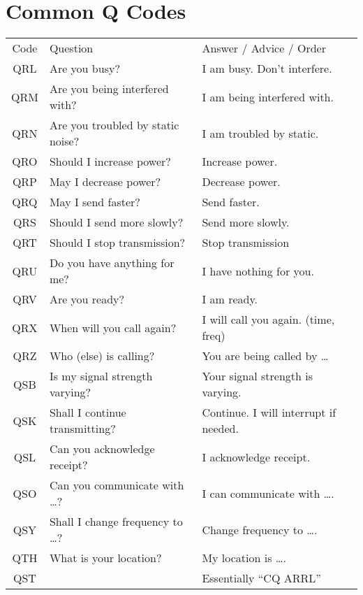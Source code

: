 \documentclass[11pt, onecolumn, table]{article}
\begin{document}
\section{Common Q Codes}
\begin{center}
  \begin{tabular}{c l l}
    Code	& Question								& Answer / Advice / Order				\\
    QRL		& Are you busy?							& I am busy. Don't interfere.			\\
    QRM		& Are you being interfered with?		& I am being interfered with.			\\
    QRN		& Are you troubled by static noise?		& I am troubled by static.				\\
    QRO		& Should I increase power?				& Increase power.						\\
    QRP		& May I decrease power?					& Decrease power.						\\
    QRQ		& May I send faster?					& Send faster.							\\
    QRS		& Should I send more slowly?			& Send more slowly.						\\
    QRT		& Should I stop transmission?			& Stop transmission						\\
    QRU		& Do you have anything for me?			& I have nothing for you.				\\
    QRV		& Are you ready?						& I am ready.							\\
    QRX		& When will you call again?				& I will call you again. (time, freq)	\\
    QRZ		& Who (else) is calling?				& You are being called by \ldots		\\
    QSB		& Is my signal strength varying?		& Your signal strength is varying.		\\
    QSK		& Shall I continue transmitting?		& Continue. I will interrupt if needed.	\\
    QSL		& Can you acknowledge receipt?			& I acknowledge receipt.				\\
    QSO		& Can you communicate with \ldots?		& I can communicate with \ldots.		\\
    QSY		& Shall I change frequency to \ldots?	& Change frequency to \ldots.			\\
    QTH		& What is your location?				& My location is \ldots.				\\
    QST		&										& Essentially ``CQ ARRL''				\\
  \end{tabular}
\end{center}
  
\end{document}
